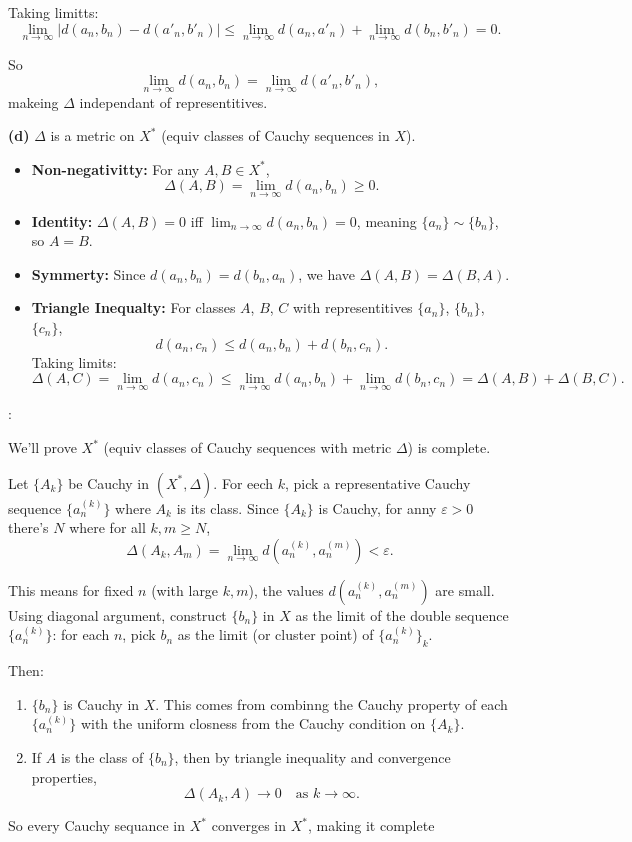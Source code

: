 \documentclass[12pt,oneside]{article}
\theoremstyle{definition}
\begin{document}
\begin{solution}
Taking limitts:
\[
\lim_{n\to\infty}\big|d(a_n,b_n)-d(a'_n,b'_n)\big| \le \lim_{n\to\infty} d(a_n,a'_n)+\lim_{n\to\infty}d(b_n,b'_n)=0.
\]

So
\[
\lim_{n\to\infty}d(a_n,b_n)=\lim_{n\to\infty}d(a'_n,b'_n),
\]
makeing \(\Delta\) independant of representitives.

\textbf{(d)} \(\Delta\) is a metric on \(X^*\) (equiv classes of Cauchy sequences in \(X\)).
\begin{itemize}
    \item \textbf{Non-negativitty:} For any \(A,B\in X^*\),
    \[
    \Delta(A,B)=\lim_{n\to\infty}d(a_n,b_n)\ge0.
    \]
    \item \textbf{Identity:} \(\Delta(A,B)=0\) iff \(\lim_{n\to\infty}d(a_n,b_n)=0\), meaning \(\{a_n\}\sim \{b_n\}\), so \(A=B\).
    \item \textbf{Symmerty:} Since \(d(a_n,b_n)=d(b_n,a_n)\), we have \(\Delta(A,B)=\Delta(B,A)\).
    \item \textbf{Triangle Inequalty:} For classes \(A\), \(B\), \(C\) with representitives \(\{a_n\}\), \(\{b_n\}\), \(\{c_n\}\),
    \[
    d(a_n,c_n) \le d(a_n,b_n)+d(b_n,c_n).
    \]
    Taking limits:
    \[
    \Delta(A,C)=\lim_{n\to\infty}d(a_n,c_n) \le \lim_{n\to\infty}d(a_n,b_n)+\lim_{n\to\infty}d(b_n,c_n)=\Delta(A,B)+\Delta(B,C).
    \]
\end{itemize}
\end{solution}

\newpage







\begin{solution}
  :
  
  We'll prove $X^*$ (equiv classes of Cauchy sequences with metric $\Delta$) is complete.
  
  Let $\{A_k\}$ be Cauchy in $(X^*,\Delta)$. For eech $k$, pick a representative Cauchy sequence $\{a^{(k)}_n\}$ where $A_k$ is its class. Since $\{A_k\}$ is Cauchy, for anny $\varepsilon>0$ there's $N$ where for all $k,m\ge N$,
  $$
  \Delta(A_k,A_m)=\lim_{n\to\infty}d(a^{(k)}_n,a^{(m)}_n)<\varepsilon.
  $$
  
  This means for fixed $n$ (with large $k,m$), the values $d(a^{(k)}_n,a^{(m)}_n)$ are small. Using diagonal argument, construct $\{b_n\}$ in $X$ as the limit of the double sequence $\{a^{(k)}_n\}$: for each $n$, pick $b_n$ as the limit (or cluster point) of $\{a^{(k)}_n\}_{k}$.
  
  Then:
  \begin{enumerate}
     \item $\{b_n\}$ is Cauchy in $X$. This comes from combinng the Cauchy property of each $\{a^{(k)}_n\}$ with the uniform closness from the Cauchy condition on $\{A_k\}$.
     \item If $A$ is the class of $\{b_n\}$, then by triangle inequality and convergence properties,
     $$
     \Delta(A_k,A) \to 0 \quad \text{as } k\to\infty.
     $$
  \end{enumerate}
  
  So every Cauchy sequance in $X^*$ converges in $X^*$, making it complete
  \end{solution}
  
\end{document}
